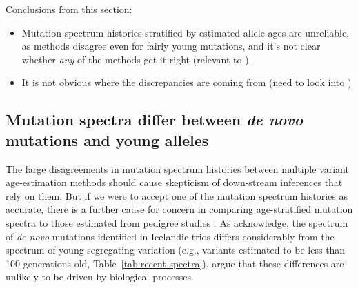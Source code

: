 \documentclass[]{article}
\begin{document}
Conclusions from this section:
\begin{itemize}
    \item Mutation spectrum histories stratified by estimated allele ages are
        unreliable, as methods disagree even for fairly young mutations,
        and it's not clear whether \emph{any} of the methods get
        it right (relevant to \citet{gao2022limited}).
    \item It is not obvious where the discrepancies are coming from (need
        to look into \citet{brandt2022evaluation})
\end{itemize}

\subsection*{Mutation spectra differ between \emph{de novo} mutations and young
alleles}

The large disagreements in mutation spectrum histories between multiple variant
age-estimation methods should cause skepticism of down-stream inferences that
rely on them. But if we were to accept one of the mutation spectrum histories
as accurate, there is a further cause for concern in comparing age-stratified
mutation spectra to those estimated from pedigree studies
\citep{jonsson2017parental,halldorsson2019characterizing}. As
\citet{wang2023human} acknowledge, the spectrum of \emph{de novo} mutations
identified in Icelandic trios \citep{jonsson2017parental} differs considerably
from the spectrum of young segregating variation (e.g., variants estimated to
be less than 100 generations old, Table~\ref{tab:recent-spectra}).
\citet{gao2022limited} argue that these differences are unlikely to be driven
by biological processes.
\end{document}
